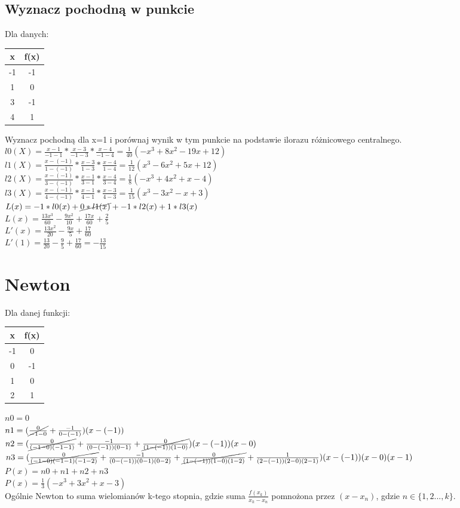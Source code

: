 \documentclass{article}
\begin{document}
\subsection{Wyznacz pochodną w punkcie}
Dla danych:
\begin{table}[H]
\begin{tabular}{|c|c|}
\hline
x  & f(x) \\ \hline
-1 & -1   \\ \hline
1  & 0    \\ \hline
3  & -1   \\ \hline
4  & 1    \\ \hline
\end{tabular}
\end{table}
Wyznacz pochodną dla x=1 i porównaj wynik w tym punkcie na podstawie ilorazu różnicowego centralnego.\\
$l0(X)=\frac{x-1}{-1-1}*\frac{x-3}{-1-3}*\frac{x-4}{-1-4} = \frac{1}{40}(-x^3+8x^2-19x+12)$\\
$l1(X)=\frac{x- (-1)}{1- (-1)}*\frac{x-3}{1-3}*\frac{x-4}{1-4} = \frac{1}{12}(x^3-6x^2+5x+12)$\\
$l2(X)=\frac{x- (-1)}{3- (-1)}*\frac{x-1}{3-1}*\frac{x-4}{3-4} = \frac{1}{8}(-x^3+4x^2+x-4)$\\
$l3(X)=\frac{x- (-1)}{4- (-1)}*\frac{x-1}{4-1}*\frac{x-3}{4-3} = \frac{1}{15}(x^3-3x^2-x+3)$\\
$L(x)=-1*l0(x)+\cancel{0*l1(x)}+-1*l2(x)+1*l3(x)$\\
$L(x)=\frac{13x^3}{60}-\frac{9x^2}{10}+\frac{17x}{60}+\frac{2}{5}$\\
$L'(x)=\frac{13x^2}{20}-\frac{9x}{5}+\frac{17}{60}$\\
$L'(1)=\frac{13}{20}-\frac{9}{5}+\frac{17}{60}=-\frac{13}{15}$

\section{Newton}
Dla danej funkcji:
\begin{table}[H]
\begin{tabular}{|c|c|}
\hline
x  & f(x) \\ \hline
-1 & 0    \\ \hline
0  & -1   \\ \hline
1  & 0    \\ \hline
2  & 1    \\ \hline
\end{tabular}%
\end{table}
$n0=0$\\
$n1=(\cancel{\frac{0}{-1-0}} + \frac{-1}{0- (-1)})(x-(-1))$\\
$n2=(\cancel{\frac{0}{(-1-0)(-1-1)}}+\frac{-1}{(0-(-1))(0-1)}+\cancel{\frac{0}{(1-(-1))(1-0)}})(x-(-1))(x-0)$\\
$n3=(\cancel{\frac{0}{(-1-0)(-1-1)(-1-2)}}+\frac{-1}{(0-(-1))(0-1)(0-2)}+\cancel{\frac{0}{(1-(-1))(1-0)(1-2)}}+\frac{1}{(2-(-1))(2-0)(2-1)})(x-(-1))(x-0)(x-1)$\\
$P(x)=n0+n1+n2+n3$\\
$P(x)=\frac{1}{3}(-x^3+3x^2+x-3)$\\
Ogólnie Newton to suma wielomianów k-tego stopnia, gdzie suma $\frac{f(x_k)}{x_k-x_n}$ pomnożona przez $(x-x_n)$, gdzie $n \in \{1,2...,k\}$.
\end{document}
